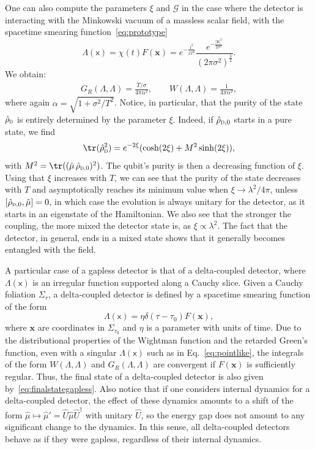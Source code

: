\documentclass[letterpaper,12pt,titlepage,oneside,final]{book}
\newcommand{\mf}{\mathsf}%
\newcommand{\tc}[1]{\textsc{#1}}
\begin{document}
One can also compute the parameters $\xi$ and $\mathcal{G}$ in the case where the detector is interacting with the Minkowski vacuum of a massless scalar field, with the spacetime smearing function~\eqref{eq:prototype}
\begin{equation}
    \Lambda(\mf x) = \chi(t) F(\bm x) = e^{- \frac{t^2}{2T^2}}\frac{e^{- \frac{|\bm x|^2}{2\sigma^2}}}{(2\pi \sigma^2)^\frac{3}{2}}.
\end{equation}
We obtain:
\begin{align}
    G_R(\Lambda,\Lambda) = \frac{T/\sigma}{4\pi \alpha^2},\quad\quad
    W(\Lambda,\Lambda) = \frac{1}{4\pi \alpha^2},
\end{align}
where again $\alpha = \sqrt{1+\sigma^2/T^2}$. Notice, in particular, that the purity of the state $\hat{\rho}_\tc{d}$ is entirely determined by the parameter $\xi$. Indeed, if  $\hat{\rho}_{\tc{d},0}$ starts in a pure state, we find
\begin{equation}
    \tr(\hat{\rho}_\tc{d}^2) = e^{-2\xi}(\cosh(2\xi) + M^2\sinh(2 \xi)),
\end{equation}
 with $M^2 = \tr((\hat{\mu}\,\hat{\rho}_{\tc{d,0}})^2)$. The qubit's purity is then a decreasing function of $\xi$. Using that $\xi$ increases with $T$, we can see that the purity of the state decreases with $T$ and asymptotically reaches its minimum value when $\xi \to \lambda^2/4\pi$, unless \mbox{$[\hat{\rho}_{\tc{d},0},\hat{\mu}] = 0$}, in which case the evolution is always unitary for the detector, as it starts in an eigenstate of the Hamiltonian. We also see that the stronger the coupling, the more mixed the detector state is, as $\xi \propto \lambda^2$. The fact that the detector, in general, ends in a mixed state shows that it generally becomes entangled with the field. 

A particular case of a gapless detector is that of a delta-coupled detector, where $\Lambda(\mf x)$ is an irregular function supported along a Cauchy slice. Given a Cauchy foliation $\Sigma_\tau$, a delta-coupled detector is defined by a spacetime smearing function of the form
\begin{equation}\label{eq:pointlike}
    \Lambda(\mf x) = \eta \delta(\tau- \tau_0) F(\bm x),
\end{equation}
where $\bm x$ are coordinates in $\Sigma_{\tau_0}$ and $\eta$ is a parameter with units of time. Due to the distributional properties of the Wightman function and the retarded Green's function, even with a singular $\Lambda(\mf x)$ such as in Eq.~\eqref{eq:pointlike}, the integrals of the form $W(\Lambda,\Lambda)$ and $G_R(\Lambda,\Lambda)$ are convergent if $F(\bm x)$ is sufficiently regular. Thus, the final state of a delta-coupled detector is also given by~\eqref{eq:finalstategapless}. Also notice that if one considers internal dynamics for a delta-coupled detector, the effect of these dynamics amounts to a shift of the form $\hat{\mu} \mapsto \hat{\mu}' = \hat{U}\hat{\mu}\hat{U}^\dagger$ with unitary $\hat{U}$, so the energy gap does not amount to any significant change to the dynamics. In this sense, all delta-coupled detectors behave as if they were gapless, regardless of their internal dynamics. 
\end{document}
